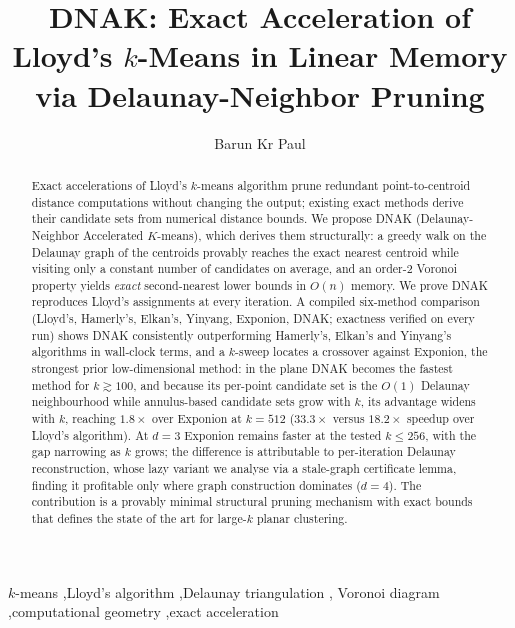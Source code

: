 \documentclass[review,12pt]{elsarticle}
\begin{document}
\begin{frontmatter}
\title{DNAK: Exact Acceleration of Lloyd's $k$-Means in Linear Memory
via Delaunay-Neighbor Pruning}

\author[1]{Barun Kr Paul}

\begin{abstract}
Exact accelerations of Lloyd's $k$-means algorithm prune redundant
point-to-centroid distance computations without changing the output;
existing exact methods derive their candidate sets from numerical
distance bounds. We propose DNAK (Delaunay-Neighbor Accelerated
$K$-means), which derives them structurally: a greedy walk on the
Delaunay graph of the centroids provably reaches the exact nearest
centroid while visiting only a constant number of candidates on
average, and an order-2 Voronoi property yields \emph{exact}
second-nearest lower bounds in $O(n)$ memory. We prove DNAK reproduces
Lloyd's assignments at every iteration. A compiled six-method
comparison (Lloyd's, Hamerly's, Elkan's, Yinyang, Exponion, DNAK;
exactness verified on every run) shows DNAK consistently outperforming
Hamerly's, Elkan's and Yinyang's algorithms in wall-clock terms, and a
$k$-sweep locates a crossover against Exponion, the strongest prior
low-dimensional method: in the plane DNAK becomes the fastest method
for $k\gtrsim 100$, and because its per-point candidate set is the
$O(1)$ Delaunay neighbourhood while annulus-based candidate sets grow
with $k$, its advantage widens with $k$, reaching $1.8\times$ over
Exponion at $k{=}512$ ($33.3\times$ versus $18.2\times$ speedup over
Lloyd's algorithm). At $d{=}3$ Exponion remains faster at the tested
$k\le 256$, with the gap narrowing as $k$ grows; the difference is
attributable to per-iteration Delaunay reconstruction, whose lazy
variant we analyse via a stale-graph certificate lemma, finding it
profitable only where graph construction dominates ($d{=}4$). The
contribution is a provably minimal structural pruning mechanism with
exact bounds that defines the state of the art for large-$k$ planar
clustering.
\end{abstract}

\begin{keyword}
$k$-means \sep Lloyd's algorithm \sep Delaunay triangulation \sep
Voronoi diagram \sep computational geometry \sep exact acceleration
\end{keyword}
\end{frontmatter}
\end{document}
